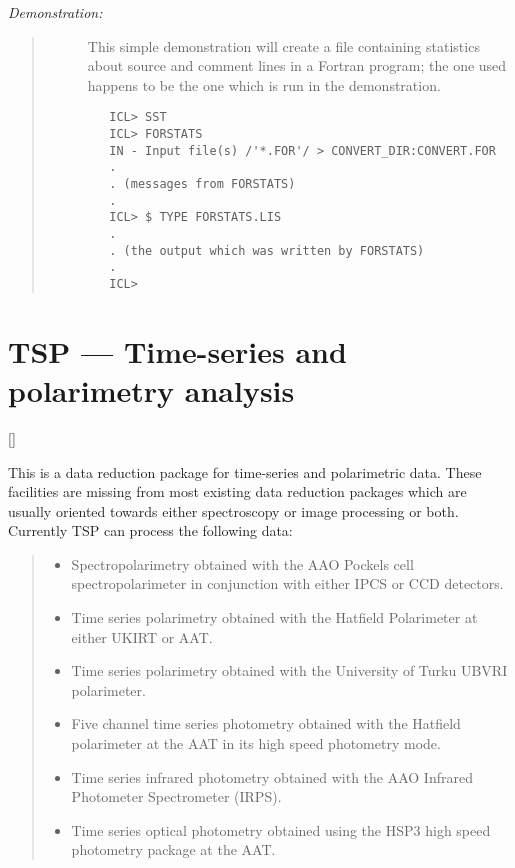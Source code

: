 {\em Demonstration:}\hfill
\begin{quote}
\begin{description}
\item [] This simple demonstration will create a file containing statistics
about source and comment lines in a Fortran program; the one used happens to
be the one which is run in the demonstration.

\begin{small}
\begin{verbatim}
   ICL> SST
   ICL> FORSTATS
   IN - Input file(s) /'*.FOR'/ > CONVERT_DIR:CONVERT.FOR
   .
   . (messages from FORSTATS)
   .
   ICL> $ TYPE FORSTATS.LIS
   .
   . (the output which was written by FORSTATS)
   .
   ICL>
\end{verbatim}
\end{small}

\end{description}
\end{quote}

\newpage

\section{TSP --- Time-series and polarimetry analysis}

\vspace{-11mm}

\hfill []

\vspace{5mm}

This is a data reduction package for time-series and polarimetric data.
These facilities are missing from most existing data reduction packages which
are usually oriented towards either spectroscopy or image processing or both.
Currently TSP can process the following data:

{\small
\begin{quote}
\begin{itemize}
\item Spectropolarimetry obtained with the AAO Pockels cell
 spectropolarimeter in conjunction with either IPCS or CCD detectors.
\item Time series polarimetry obtained with the Hatfield Polarimeter
 at either UKIRT or AAT.
\item Time series polarimetry obtained with the University of Turku
 UBVRI polarimeter.
\item Five channel time series photometry obtained with the Hatfield
 polarimeter at the AAT in its high speed photometry mode.
\item Time series infrared photometry obtained with the AAO Infrared
 Photometer Spectrometer (IRPS).
\item Time series optical photometry obtained using the HSP3 high speed
photometry package at the AAT.
\end{itemize}
\end{quote}
}

